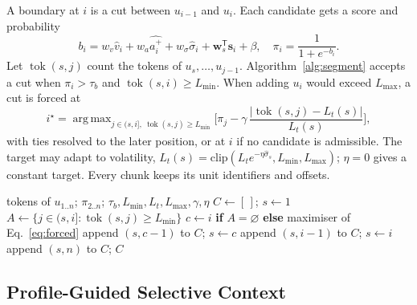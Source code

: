 \documentclass[conference,a4paper]{IEEEtran}
\DeclareMathOperator*{\argmax}{arg\,max}
\newcommand{\tok}{\operatorname{tok}}
\begin{document}
A boundary at $i$ is a cut between $u_{i-1}$ and $u_i$. Each candidate gets a score and probability
\begin{equation}
b_i = w_v\hat v_i + w_a\widehat{a^+_i} + w_\sigma\hat\sigma_i + \mathbf{w}_s^{\mathsf T}\mathbf{s}_i + \beta,\quad \pi_i = \frac{1}{1+e^{-b_i}}.
\label{eq:boundary}
\end{equation}
Let $\tok(s,j)$ count the tokens of $u_s,\ldots,u_{j-1}$. Algorithm~\ref{alg:segment} accepts a cut when $\pi_i>\tau_b$ and $\tok(s,i)\ge L_{\min}$. When adding $u_i$ would exceed $L_{\max}$, a cut is forced at
\begin{equation}
i^\star = \argmax_{j\in(s,i],\ \tok(s,j)\ge L_{\min}} \Big[\pi_j - \gamma\,\frac{|\tok(s,j)-L_t(s)|}{L_t(s)}\Big],
\label{eq:forced}
\end{equation}
with ties resolved to the later position, or at $i$ if no candidate is admissible. The target may adapt to volatility, $L_t(s)=\mathrm{clip}(L_t e^{-\eta\hat\sigma_s},L_{\min},L_{\max})$; $\eta=0$ gives a constant target. Every chunk keeps its unit identifiers and offsets.

\begin{algorithm}[t]
\caption{Reference STP segmentation}
\label{alg:segment}
\footnotesize
\begin{algorithmic}[1]
\Require tokens of $u_{1..n}$; $\pi_{2..n}$; $\tau_b,L_{\min},L_t,L_{\max},\gamma,\eta$
\State $C\gets[\,]$; $s\gets1$
  \If{$\tok(s,i+1)>L_{\max}$} 
    \State $A\gets\{j\in(s,i]:\tok(s,j)\ge L_{\min}\}$
    \State $c\gets i$ \textbf{if} $A=\varnothing$ \textbf{else} maximiser of Eq.~\eqref{eq:forced}
    \State append $(s,c-1)$ to $C$; $s\gets c$
  \ElsIf{$\pi_i>\tau_b$ \textbf{and} $\tok(s,i)\ge L_{\min}$}
    \State append $(s,i-1)$ to $C$; $s\gets i$
  \EndIf
\EndFor
\State append $(s,n)$ to $C$; \Return $C$
\end{algorithmic}
\end{algorithm}

\subsection{Profile-Guided Selective Context}
\end{document}
